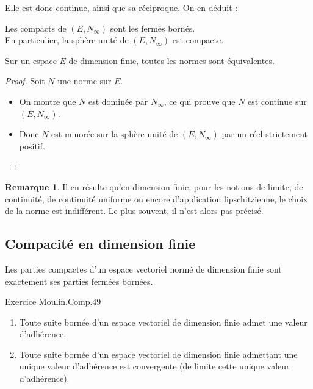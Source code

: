 \documentclass[french]{article}
\theoremstyle{plain}
\theoremstyle{definition}
\newtheorem*{rmq}{Remarque}
\theoremstyle{remark}
\begin{document}
Elle est donc continue, ainsi que sa réciproque. On en déduit :

\begin{lem}%
	Les compacts de $(E,N_\infty)$ sont les fermés bornés. \\
	En particulier, la sphère unité de $(E,N_\infty)$ est compacte.
\end{lem}

\begin{thm}%
	Sur un espace $E$ de dimension finie, toutes les normes sont équivalentes.
\end{thm}

\begin{proof}
	Soit $N$ une norme sur $E$.
	\begin{itemize}
		\item On montre que $N$ est dominée par $N_\infty$, ce qui prouve que $N$ est continue sur $(E,N_\infty)$.
		\item Donc $N$ est minorée sur la sphère unité de $(E,N_\infty)$ par un réel strictement positif.
	\end{itemize}
\end{proof}

\begin{rmq}
	Il en résulte qu'en dimension finie, pour les notions de limite, de continuité, de continuité uniforme ou encore d'application lipschitzienne, le choix de la norme est indifférent. Le plus souvent, il n'est alors pas précisé.
\end{rmq}

\subsection{Compacité en dimension finie}

\begin{thm}%
	Les parties compactes d'un espace vectoriel normé de dimension finie sont exactement ses parties fermées bornées.
\end{thm}

Exercice Moulin.Comp.49

\begin{cor}%
	\begin{enumerate}
		\item Toute suite bornée d'un espace vectoriel de dimension finie admet une valeur d'adhérence.
		\item Toute suite bornée d'un espace vectoriel de dimension finie admettant une unique valeur d'adhérence est convergente (de limite cette unique valeur d'adhérence).
	\end{enumerate}
\end{cor}
\end{document}
